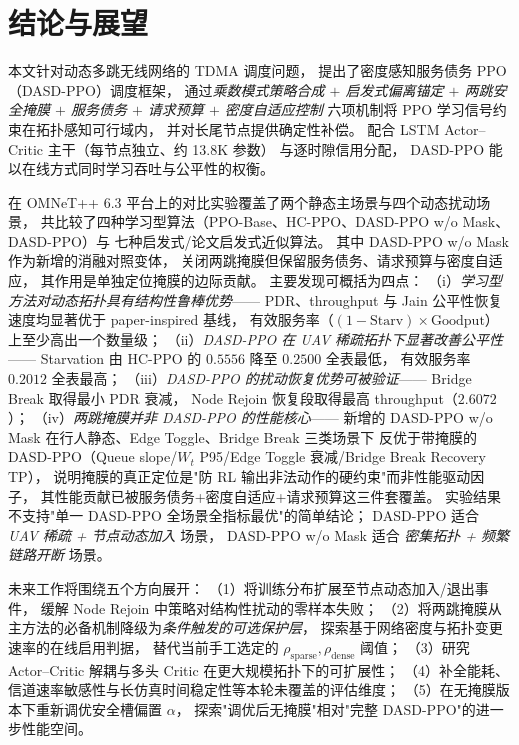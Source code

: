 \section{结论与展望}
\label{sec:conclusion}

本文针对动态多跳无线网络的 TDMA 调度问题，
提出了密度感知服务债务 PPO（DASD-PPO）调度框架，
通过\emph{乘数模式策略合成 \(+\) 启发式偏离锚定 \(+\) 两跳安全掩膜
\(+\) 服务债务 \(+\) 请求预算 \(+\) 密度自适应控制}
六项机制将 PPO 学习信号约束在拓扑感知可行域内，
并对长尾节点提供确定性补偿。
配合 LSTM Actor--Critic 主干（每节点独立、约 13.8K 参数）
与逐时隙信用分配，
DASD-PPO 能以在线方式同时学习吞吐与公平性的权衡。

在 OMNeT++ 6.3 平台上的对比实验覆盖了两个静态主场景与四个动态扰动场景，
共比较了四种学习型算法（PPO-Base、HC-PPO、DASD-PPO w/o Mask、DASD-PPO）与
七种启发式/论文启发式近似算法。
其中 DASD-PPO w/o Mask 作为新增的消融对照变体，
关闭两跳掩膜但保留服务债务、请求预算与密度自适应，
其作用是单独定位掩膜的边际贡献。
主要发现可概括为四点：
（i）\emph{学习型方法对动态拓扑具有结构性鲁棒优势}——
PDR、throughput 与 Jain 公平性恢复速度均显著优于 paper-inspired 基线，
有效服务率（\((1-\mathrm{Starv})\times\mathrm{Goodput}\)）上至少高出一个数量级；
（ii）\emph{DASD-PPO 在 UAV 稀疏拓扑下显著改善公平性}——
Starvation 由 HC-PPO 的 \(0.5556\) 降至 \(\mathbf{0.2500}\) 全表最低，
有效服务率 \(\mathbf{0.2012}\) 全表最高；
（iii）\emph{DASD-PPO 的扰动恢复优势可被验证}——
Bridge Break 取得最小 PDR 衰减，
Node Rejoin 恢复段取得最高 throughput（\(2.6072\)）；
（iv）\emph{两跳掩膜并非 DASD-PPO 的性能核心}——
新增的 DASD-PPO w/o Mask 在行人静态、Edge Toggle、Bridge Break 三类场景下
反优于带掩膜的 DASD-PPO（Queue slope/\(W_t\) P95/Edge Toggle 衰减/Bridge Break Recovery TP），
说明掩膜的真正定位是"防 RL 输出非法动作的硬约束"而非性能驱动因子，
其性能贡献已被服务债务+密度自适应+请求预算这三件套覆盖。
实验结果不支持"单一 DASD-PPO 全场景全指标最优"的简单结论；
DASD-PPO 适合 \emph{UAV 稀疏 + 节点动态加入} 场景，
DASD-PPO w/o Mask 适合 \emph{密集拓扑 + 频繁链路开断} 场景。

未来工作将围绕五个方向展开：
（1）将训练分布扩展至节点动态加入/退出事件，
    缓解 Node Rejoin 中策略对结构性扰动的零样本失败；
（2）将两跳掩膜从主方法的必备机制降级为\emph{条件触发的可选保护层}，
    探索基于网络密度与拓扑变更速率的在线启用判据，
    替代当前手工选定的 \(\rho_{\mathrm{sparse}},\rho_{\mathrm{dense}}\) 阈值；
（3）研究 Actor--Critic 解耦与多头 Critic 在更大规模拓扑下的可扩展性；
（4）补全能耗、信道速率敏感性与长仿真时间稳定性等本轮未覆盖的评估维度；
（5）在无掩膜版本下重新调优安全槽偏置 \(\alpha\)，
    探索"调优后无掩膜"相对"完整 DASD-PPO"的进一步性能空间。
